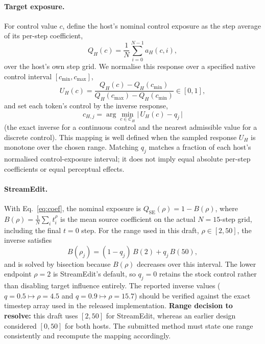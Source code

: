 \documentclass[10pt,twocolumn]{article}
\begin{document}
\paragraph{Target exposure.}
For control value $c$, define the host's nominal control exposure as the step average of its per-step coefficient,
\begin{equation}
Q_H(c) = \frac{1}{N}\sum_{i=0}^{N-1} a_H(c,i),
\end{equation}
over the host's own step grid. We normalise this response over a specified native control interval $[c_{\min},c_{\max}]$,
\begin{equation}
U_H(c) = \frac{Q_H(c)-Q_H(c_{\min})}{Q_H(c_{\max})-Q_H(c_{\min})}\in[0,1],
\end{equation}
and set each token's control by the inverse response,
\begin{equation}
\boxed{\,c_{H,j} = \arg\min_{c\in\mathcal{C}_H}\big|\,U_H(c) - q_j\,\big|\,}
\label{eq:inverse}
\end{equation}
(the exact inverse for a continuous control and the nearest admissible value for a discrete control). This mapping is well defined when the sampled response $U_H$ is monotone over the chosen range. Matching $q_j$ matches a fraction of each host's normalised control-exposure interval; it does not imply equal absolute per-step coefficients or equal perceptual effects.

\paragraph{StreamEdit.}
With Eq.~\eqref{eq:coef}, the nominal exposure is $Q_{\mathrm{SE}}(\rho)=1-B(\rho)$, where $B(\rho)=\frac1N\sum_i t_i^{\rho}$ is the mean source coefficient on the actual $N=15$-step grid, including the final $t=0$ step. For the range used in this draft, $\rho\in[2,50]$, the inverse satisfies
\begin{equation}
B(\rho_j) = (1-q_j)\,B(2) + q_j\,B(50),
\end{equation}
and is solved by bisection because $B(\rho)$ decreases over this interval. The lower endpoint $\rho=2$ is StreamEdit's default, so $q_j=0$ retains the stock control rather than disabling target influence entirely. The reported inverse values ($q=0.5\mapsto\rho=4.5$ and $q=0.9\mapsto\rho=15.7$) should be verified against the exact timestep array used in the released implementation. \textbf{Range decision to resolve:} this draft uses $[2,50]$ for StreamEdit, whereas an earlier design considered $[0,50]$ for both hosts. The submitted method must state one range consistently and recompute the mapping accordingly.
\end{document}
